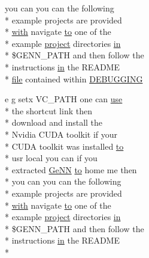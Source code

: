 \begin{DoxyCompactItemize}
you can you can the following \\*
example projects are provided \\*
\hyperlink{userproject_2OneComp__project_2README_8txt_ace09bb40fbf4457ad9a9340a67a4fa9a}{with} navigate \hyperlink{README_8txt_add1f2ee32acc15ef77f839d4382c9768}{to} one of the \\*
example \hyperlink{userproject_2SynDelay__project_2README_8txt_a762c750134e07a31b7965860fd292b51}{project} directories \hyperlink{README_8txt_a148897a6b2cc9cff25af80abb13426b0}{in} \\*
\$G\+E\+N\+N\+\_\+\+P\+A\+T\+H and then follow the \\*
instructions \hyperlink{README_8txt_a148897a6b2cc9cff25af80abb13426b0}{in} the R\+E\+A\+D\+M\+E \\*
\hyperlink{README_8txt_a6f45b2930c1b79b67034355b4701dc56}{file} contained within \hyperlink{README_8txt_aa8cc1c4c0e0bbfa3092bcd554c31770a}{D\+E\+B\+U\+G\+G\+I\+N\+G}
\item 
e g setx V\+C\+\_\+\+P\+A\+T\+H one can \hyperlink{README_8txt_acf386c48a14a2099c9220d6bcde40fc8}{use} \\*
the shortcut link then \\*
download and install the \\*
Nvidia C\+U\+D\+A toolkit if your \\*
C\+U\+D\+A toolkit was installed \hyperlink{README_8txt_add1f2ee32acc15ef77f839d4382c9768}{to} \\*
usr local you can if you \\*
extracted \hyperlink{README_8txt_a431a8d9aae97c72793fee7c3edd68559}{Ge\+N\+N} \hyperlink{README_8txt_add1f2ee32acc15ef77f839d4382c9768}{to} home me then \\*
you can you can the following \\*
example projects are provided \\*
\hyperlink{userproject_2OneComp__project_2README_8txt_ace09bb40fbf4457ad9a9340a67a4fa9a}{with} navigate \hyperlink{README_8txt_add1f2ee32acc15ef77f839d4382c9768}{to} one of the \\*
example \hyperlink{userproject_2SynDelay__project_2README_8txt_a762c750134e07a31b7965860fd292b51}{project} directories \hyperlink{README_8txt_a148897a6b2cc9cff25af80abb13426b0}{in} \\*
\$G\+E\+N\+N\+\_\+\+P\+A\+T\+H and then follow the \\*
instructions \hyperlink{README_8txt_a148897a6b2cc9cff25af80abb13426b0}{in} the R\+E\+A\+D\+M\+E \\*

\end{DoxyCompactItemize}
